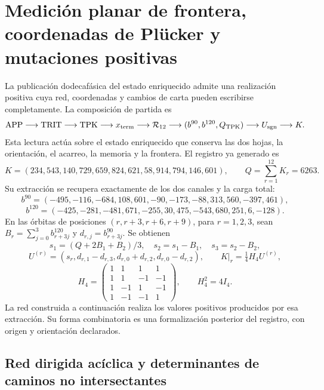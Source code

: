 \section{Medición planar de frontera, coordenadas de Plücker y mutaciones positivas}
\label{app:network-cluster}

La publicación dodecafásica del estado enriquecido admite una realización
positiva cuya red, coordenadas y cambios de carta pueden escribirse
completamente. La composición de partida es
\[
 \mathrm{APP}\longrightarrow\mathrm{TRIT}\longrightarrow\mathrm{TPK}
 \longrightarrow x_{\rm term}\longrightarrow\mathcal R_{12}
 \longrightarrow(b^{90},b^{120},Q_{\rm TPK})
 \longrightarrow U_{\rm sgn}\longrightarrow K.
\]
Esta lectura actúa sobre el estado enriquecido que conserva las dos hojas,
la orientación, el acarreo, la memoria y la frontera. El registro ya generado
es
\[
 K=(234,543,140,729,659,824,621,58,914,794,146,601),
 \qquad Q=\sum_{r=1}^{12}K_r=6263.
\]
Su extracción se recupera exactamente de los dos canales y la carga total:
\[
 b^{90}=(-495,-116,-684,108,601,-90,-173,-88,313,560,-397,461),
\]
\[
 b^{120}=(-425,-281,-481,671,-255,30,475,-543,680,251,6,-128).
\]
En las órbitas de posiciones \((r,r+3,r+6,r+9)\), para \(r=1,2,3\),
sean \(B_r=\sum_{j=0}^3b^{120}_{r+3j}\) y
\(d_{r,j}=b^{90}_{r+3j}\). Se obtienen
\[
 s_1=(Q+2B_1+B_2)/3,\quad s_2=s_1-B_1,\quad s_3=s_2-B_2,
\]
\[
 U^{(r)}=(s_r,d_{r,1}-d_{r,3},d_{r,0}+d_{r,2},d_{r,0}-d_{r,2}),
 \qquad K|_r=\tfrac14H_4U^{(r)},
\]
\[
 H_4=\begin{pmatrix}1&1&1&1\\1&1&-1&-1\\1&-1&1&-1\\1&-1&-1&1\end{pmatrix},
 \qquad H_4^2=4I_4.
\]
La red construida a continuación realiza los valores positivos producidos
por esa extracción. Su forma combinatoria es una formalización posterior
del registro, con origen y orientación declarados.

\subsection{Red dirigida acíclica y determinantes de caminos no intersectantes}

